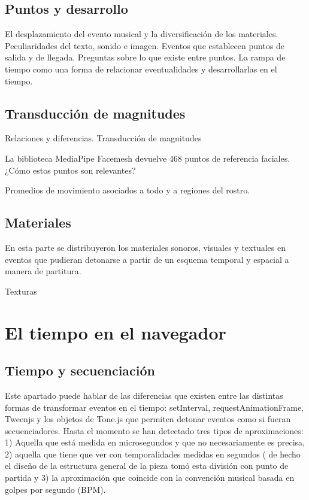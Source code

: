 \subsection{Puntos y desarrollo}

El desplazamiento del evento musical y la diversificación de los materiales. Peculiaridades del texto, sonido e imagen. Eventos que establecen puntos de salida y de llegada. Preguntas sobre lo que existe entre puntos. La rampa de tiempo como una forma de relacionar eventualidades y desarrollarlas en el tiempo.

\subsection{Transducción de magnitudes}

Relaciones y diferencias. Transducción de magnitudes 

La biblioteca MediaPipe Facemesh devuelve 468 puntos de referencia faciales. ¿Cómo estos puntos son relevantes? 

Promedios de movimiento asociados a todo y a regiones del rostro. 

\subsection{Materiales}


En esta parte se distribuyeron los materiales sonoros, visuales y textuales en eventos que pudieran detonarse a partir de un esquema temporal y espacial a manera de partitura. 

Texturas

\section{El tiempo en el navegador}

\subsection{Tiempo y secuenciación}

Este apartado puede hablar de las diferencias que existen entre las distintas formas de transformar eventos en el tiempo: setInterval, requestAnimationFrame, Tweenjs y los objetos de Tone.js que permiten detonar eventos como si fueran secuenciadores. Hasta el momento se han detectado tres tipos de aproximaciones: 1) Aquella que está medida en microsegundos y que no necesariamente es precisa, 2) aquella que tiene que ver con temporalidades medidas en segundos ( de hecho el diseño de la estructura general de la pieza tomó esta división con punto de partida y 3) la aproximación que coincide con la convención musical basada en golpes por segundo (BPM). 

